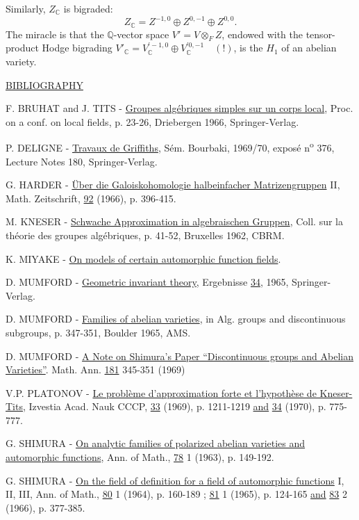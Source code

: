 \documentclass[10pt]{article}
\newcommand{\C}{\mathbb C}
\newcommand{\Q}{\mathbb Q}
\begin{document}
Similarly, $Z_{\C}$ is bigraded:
\[
Z_{\C}=Z^{-1,0}\oplus Z^{0,-1}\oplus Z^{0,0}.
\]
The miracle is that the $\Q$-vector space $V'=V\otimes_F Z$, endowed with the tensor-product Hodge bigrading
$\displaystyle V'_{\C}=V_{\C}^{\prime -1,0}\oplus V_{\C}^{\prime 0,-1}\quad(!)$, is the $H_1$ of an abelian variety.

\noindent\uline{BIBLIOGRAPHY}

\vspace{1.5\baselineskip}

\begin{description}[leftmargin=3.0em,labelwidth=2.4em,labelsep=.6em,font=\normalfont,style=multiline]
\item[{[1]}] F. BRUHAT and J. TITS - \uline{Groupes algébriques simples sur un corps local}, Proc. on a conf. on local fields, p. 23-26, Driebergen 1966, Springer-Verlag.
\item[{[2]}] P. DELIGNE - \uline{Travaux de Griffiths}, Sém. Bourbaki, 1969/70, exposé n\textsuperscript{o} 376, Lecture Notes 180, Springer-Verlag.
\item[{[3]}] G. HARDER - \uline{Über die Galoiskohomologie halbeinfacher Matrizengruppen} II, Math. Zeitschrift, \uline{92} (1966), p. 396-415.
\item[{[4]}] M. KNESER - \uline{Schwache Approximation in algebraischen Gruppen}, Coll. sur la théorie des groupes algébriques, p. 41-52, Bruxelles 1962, CBRM.
\item[{[5]}] K. MIYAKE - \uline{On models of certain automorphic function fields}.
\item[{[6]}] D. MUMFORD - \uline{Geometric invariant theory}, Ergebnisse \uline{34}, 1965, Springer-Verlag.
\item[{[7]}] D. MUMFORD - \uline{Families of abelian varieties}, in Alg. groups and discontinuous subgroups, p. 347-351, Boulder 1965, AMS.
\item[{[8]}] D. MUMFORD - \uline{A Note on Shimura's Paper ``Discontinuous groups and Abelian Varieties''}. Math. Ann. \uline{181} 345-351 (1969)
\item[{[9]}] V.P. PLATONOV - \uline{Le problème d'approximation forte et l'hypothèse de Kneser-Tits}, Izvestia Acad. Nauk CCCP, \uline{33} (1969), p. 1211-1219 \uline{and} \uline{34} (1970), p. 775-777.
\item[{[10]}] G. SHIMURA - \uline{On analytic families of polarized abelian varieties and automorphic functions}, Ann. of Math., \uline{78} 1 (1963), p. 149-192.
\item[{[11]}] G. SHIMURA - \uline{On the field of definition for a field of automorphic functions} I, II, III, Ann. of Math., \uline{80} 1 (1964), p. 160-189 ; \uline{81} 1 (1965), p. 124-165 \uline{and} \uline{83} 2 (1966), p. 377-385.

\end{description}
\end{document}

